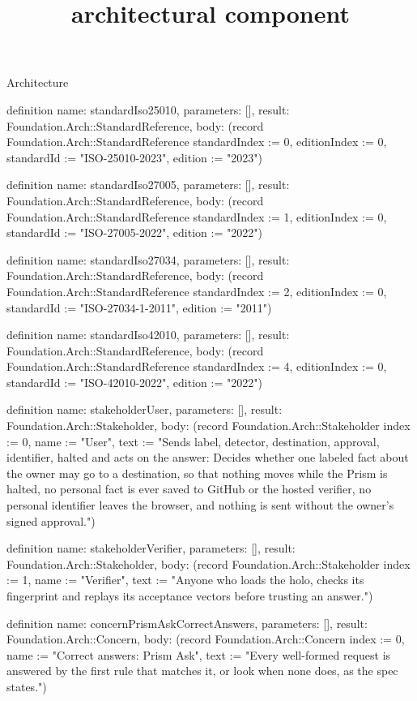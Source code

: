 \begin{lexlean}{Architecture}
\title{architectural component}
\begin{semanticmodule}
definition{
  name: standardIso25010,
  parameters: [],
  result: Foundation.Arch::StandardReference,
  body: (record Foundation.Arch::StandardReference {standardIndex := 0, editionIndex := 0, standardId := "ISO-25010-2023", edition := "2023"})
}

definition{
  name: standardIso27005,
  parameters: [],
  result: Foundation.Arch::StandardReference,
  body: (record Foundation.Arch::StandardReference {standardIndex := 1, editionIndex := 0, standardId := "ISO-27005-2022", edition := "2022"})
}

definition{
  name: standardIso27034,
  parameters: [],
  result: Foundation.Arch::StandardReference,
  body: (record Foundation.Arch::StandardReference {standardIndex := 2, editionIndex := 0, standardId := "ISO-27034-1-2011", edition := "2011"})
}

definition{
  name: standardIso42010,
  parameters: [],
  result: Foundation.Arch::StandardReference,
  body: (record Foundation.Arch::StandardReference {standardIndex := 4, editionIndex := 0, standardId := "ISO-42010-2022", edition := "2022"})
}

definition{
  name: stakeholderUser,
  parameters: [],
  result: Foundation.Arch::Stakeholder,
  body: (record Foundation.Arch::Stakeholder {index := 0, name := "User", text := "Sends label, detector, destination, approval, identifier, halted and acts on the answer: Decides whether one labeled fact about the owner may go to a destination, so that nothing moves while the Prism is halted, no personal fact is ever saved to GitHub or the hosted verifier, no personal identifier leaves the browser, and nothing is sent without the owner's signed approval."})
}

definition{
  name: stakeholderVerifier,
  parameters: [],
  result: Foundation.Arch::Stakeholder,
  body: (record Foundation.Arch::Stakeholder {index := 1, name := "Verifier", text := "Anyone who loads the holo, checks its fingerprint and replays its acceptance vectors before trusting an answer."})
}

definition{
  name: concernPrismAskCorrectAnswers,
  parameters: [],
  result: Foundation.Arch::Concern,
  body: (record Foundation.Arch::Concern {index := 0, name := "Correct answers: Prism Ask", text := "Every well-formed request is answered by the first rule that matches it, or look when none does, as the spec states."})
}


\end{semanticmodule}
\end{lexlean}

